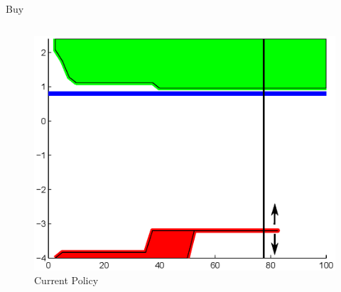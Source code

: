 \documentclass{beamer}
\begin{document}
\begin{frame}

{\large Buy}
\begin{columns}
\begin{figure}[hbt]
  \includegraphics[scale = 0.4]{Where2Move13step.eps}
  \caption{Current Policy}
\end{figure}
\end{columns}
\end{frame}
\end{document}

